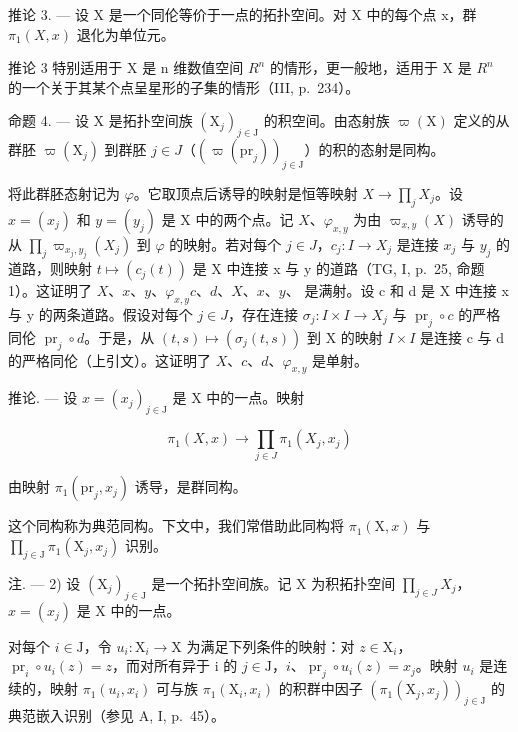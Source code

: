 推论 3. --- 设 X 是一个同伦等价于一点的拓扑空间。对 X 中的每个点 x，群 \(\pi_{1}(X,x)\) 退化为单位元。

推论 3 特别适用于 X 是 n 维数值空间 \(R^{n}\) 的情形，更一般地，适用于 X 是 \(R^{n}\) 的一个关于其某个点呈星形的子集的情形（III, p.~234）。

命题 4. --- 设 X 是拓扑空间族 \((\mathrm{X}_{j})_{j\in\mathrm{J}}\) 的积空间。由态射族 \(\varpi(\mathrm{X})\) 定义的从群胚 \(\varpi(\mathrm{X}_{j})\) 到群胚 \(j\in J\)（\((\varpi(\mathrm{pr}_{j}))_{j\in\mathrm{J}}\)）的积的态射是同构。

将此群胚态射记为 \(\varphi\)。它取顶点后诱导的映射是恒等映射 \(X \to \prod_{j} X_{j}\)。设 \(x = (x_{j})\) 和 \(y = (y_{j})\) 是 X 中的两个点。记 \(X\)、\(\varphi_{x,y}\) 为由 \(\varpi_{x,y}(X)\) 诱导的从 \(\prod_{j} \varpi_{x_{j},y_{j}}(X_{j})\) 到 \(\varphi\) 的映射。若对每个 \(j \in J\)，\(c_{j}: I \to X_{j}\) 是连接 \(x_{j}\) 与 \(y_{j}\) 的道路，则映射 \(t \mapsto (c_{j}(t))\) 是 X 中连接 x 与 y 的道路（TG, I, p.~25, 命题 1）。这证明了 \(X\)、\(x\)、\(y\)、\(\varphi_{x,y}\)\(c\)、\(d\)、\(X\)、\(x\)、\(y\)、 是满射。设 c 和 d 是 X 中连接 x 与 y 的两条道路。假设对每个 \(j \in J\)，存在连接 \(\sigma_{j}: I \times I \to X_{j}\) 与 \(\operatorname{pr}_{j} \circ c\) 的严格同伦 \(\operatorname{pr}_{j} \circ d\)。于是，从 \((t,s) \mapsto (\sigma_{j}(t,s))\) 到 X 的映射 \(I \times I\) 是连接 c 与 d 的严格同伦（上引文）。这证明了 \(X\)、\(c\)、\(d\)、\(\varphi_{x,y}\) 是单射。

推论. --- 设 \(x = (x_{j})_{j \in \mathrm{J}}\) 是 X 中的一点。映射

\[
\pi_ {1} (X, x) \to \prod_ {j \in J} \pi_ {1} (X _ {j}, x _ {j})
\]

由映射 \(\pi_1(\mathrm{pr}_j, x_j)\) 诱导，是群同构。

这个同构称为典范同构。下文中，我们常借助此同构将 \(\pi_{1}(\mathrm{X},x)\) 与 \(\prod_{j\in\mathrm{J}}\pi_{1}(\mathrm{X}_{j},x_{j})\) 识别。

注. --- 2) 设 \((\mathrm{X}_{j})_{j\in\mathrm{J}}\) 是一个拓扑空间族。记 X 为积拓扑空间 \(\prod_{j\in J}X_{j}\)，\(x=(x_{j})\) 是 X 中的一点。

对每个 \(i \in \mathrm{J}\)，令 \(u_i: \mathrm{X}_i \to \mathrm{X}\) 为满足下列条件的映射：对 \(z \in \mathrm{X}_i\)，\(\operatorname{pr}_i \circ u_i(z) = z\)，而对所有异于 i 的 \(j \in \mathrm{J}\)，\(i\)、\(\operatorname{pr}_j \circ u_i(z) = x_j\)。映射 \(u_i\) 是连续的，映射 \(\pi_1(u_i, x_i)\) 可与族 \(\pi_1(\mathrm{X}_i, x_i)\) 的积群中因子 \((\pi_1(\mathrm{X}_j, x_j))_{j \in \mathrm{J}}\) 的典范嵌入识别（参见 A, I, p.~45）。

